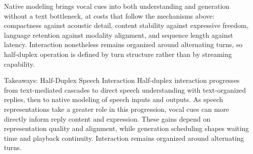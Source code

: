 Native modeling brings vocal cues into both understanding and generation without a text bottleneck, at costs that follow the mechanisms above: compactness against acoustic detail, content stability against expressive freedom, language retention against modality alignment, and sequence length against latency. Interaction nonetheless remains organized around alternating turns, so half-duplex operation is defined by turn structure rather than by streaming capability.


\begin{TakeawayBox}{Takeaways: Half-Duplex Speech Interaction}
Half-duplex interaction progresses from text-mediated cascades to direct speech understanding with text-organized replies, then to native modeling of speech inputs and outputs. As speech representations take a greater role in this progression, vocal cues can more directly inform reply content and expression. These gains depend on representation quality and alignment, while generation scheduling shapes waiting time and playback continuity. Interaction remains organized around alternating turns.
\end{TakeawayBox}

